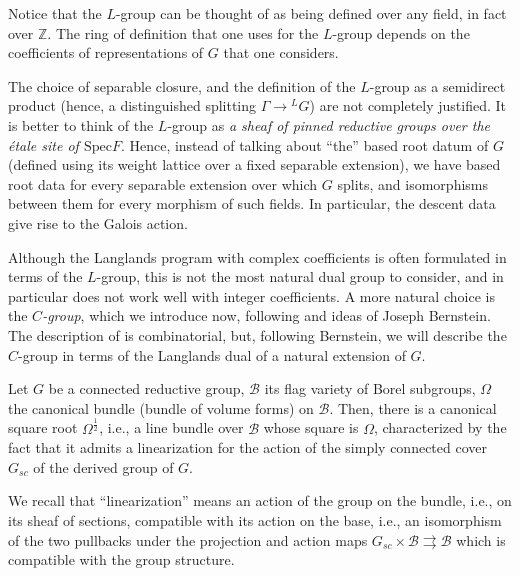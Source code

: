 Notice that the $L$-group can be thought of as being defined over any field, in fact over $\mathbb Z$. The ring of definition that one uses for the $L$-group depends on the coefficients of representations of $G$ that one considers.

\begin{remark}
 \label{remark-Lgroup-sheaf}
The choice of separable closure, and the definition of the $L$-group as a semidirect product (hence, a distinguished splitting $\Gamma \to {^LG}$) are not completely justified. It is better to think of the $L$-group as \emph{a sheaf of pinned reductive groups over the \'etale site of $\text{Spec} F$}. Hence, instead of talking about ``the'' based root datum of $G$ (defined using its weight lattice over a fixed separable extension), we have based root data for every separable extension over which $G$ splits, and isomorphisms between them for every morphism of such fields. In particular, the descent data give rise to the Galois action.
\end{remark}



Although the Langlands program with complex coefficients is often formulated in terms of the $L$-group, this is not the most natural dual group to consider, and in particular does not work well with integer coefficients. A more natural choice is the \emph{$C$-group}, which we introduce now, following \cite{Buzzard-Gee} and ideas of Joseph Bernstein. The description of \cite{Buzzard-Gee} is combinatorial, but, following Bernstein, we will describe the $C$-group in terms of the Langlands dual of a natural extension of $G$.

\begin{lemma}
 \label{lemma-squareroot-canonicalbundle}
Let $G$ be a connected reductive group, $\mathcal B$ its flag variety of Borel subgroups, $\Omega$ the canonical bundle (bundle of volume forms) on $\mathcal B$. Then, there is a canonical square root $\Omega^\frac{1}{2}$, i.e., a line bundle over $\mathcal B$ whose square is $\Omega$, characterized by the fact that it admits a linearization for the action of the simply connected cover $G_{sc}$ of the derived group of $G$. 
\end{lemma}

We recall that ``linearization'' means an action of the group on the bundle, i.e., on its sheaf of sections, compatible with its action on the base, i.e., an isomorphism of the two pullbacks under the projection and action maps $G_{sc} \times \mathcal B \rightrightarrows \mathcal B$ which is compatible with the group structure.


